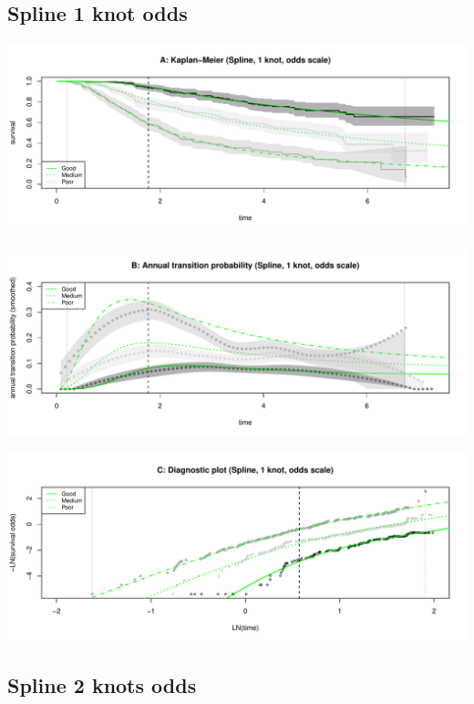 \documentclass[
]{article}
\begin{document}
\hypertarget{spline-1-knot-odds}{%
\subsection{Spline 1 knot odds}\label{spline-1-knot-odds}}

\begin{flushleft}\includegraphics[height=0.25\textheight]{Images/spline_odds1-1} \end{flushleft}

\begin{flushleft}\includegraphics[height=0.25\textheight]{Images/spline_odds1-2} \end{flushleft}

\begin{flushleft}\includegraphics[height=0.25\textheight]{Images/spline_odds1-3} \end{flushleft}

\hypertarget{spline-2-knots-odds}{%
\subsection{Spline 2 knots odds}\label{spline-2-knots-odds}}
\end{document}
